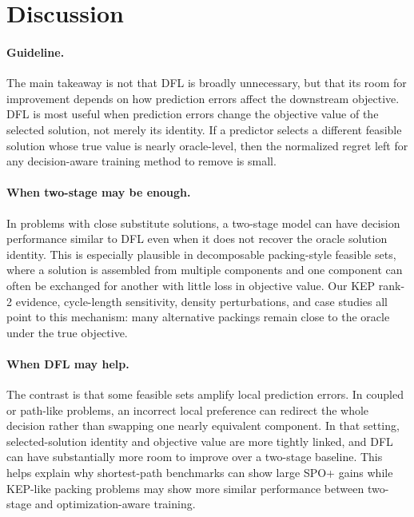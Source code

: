 \section{Discussion}

\paragraph{Guideline.}
The main takeaway is not that DFL is broadly unnecessary, but that its room for
improvement depends on how prediction errors affect the downstream objective.
DFL is most useful when prediction errors change the objective value of the
selected solution, not merely its identity. If a predictor selects a different
feasible solution whose true value is nearly oracle-level, then the normalized
regret left for any decision-aware training method to remove is small.

\paragraph{When two-stage may be enough.}
In problems with close substitute solutions, a two-stage model can have decision
performance similar to DFL even when it does not recover the oracle solution
identity. This is especially plausible in decomposable packing-style feasible
sets, where a solution is assembled from multiple components and one component
can often be exchanged for another with little loss in objective value. Our KEP
rank-2 evidence, cycle-length sensitivity, density perturbations, and case
studies all point to this mechanism: many alternative packings remain close to
the oracle under the true objective.

\paragraph{When DFL may help.}
The contrast is that some feasible sets amplify local prediction errors. In
coupled or path-like problems, an incorrect local preference can redirect the
whole decision rather than swapping one nearly equivalent component. In that
setting, selected-solution identity and objective value are more tightly linked,
and DFL can have substantially more room to improve over a two-stage baseline.
This helps explain why shortest-path benchmarks can show large SPO+ gains while
KEP-like packing problems may show more similar performance between two-stage
and optimization-aware training.

